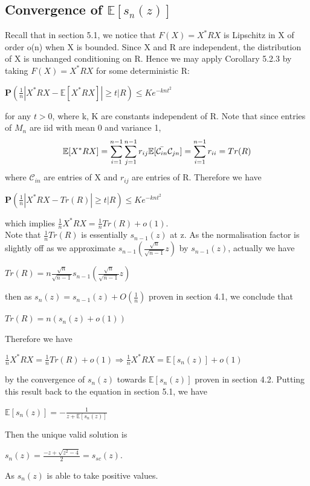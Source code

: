 \documentclass{article}
\begin{document}
\subsection{Convergence of $\mathbb{E}[s_n(z)]$}
Recall that in section 5.1, we notice that $F(X) = X^*RX$ is Lipschitz in X of order o(n) when X is bounded. Since X and R are independent, the distribution of X is unchanged conditioning on R. Hence we may apply Corollary 5.2.3 by taking $F(X) = X^*RX$ for some deterministic R:
\begin{center}
    $\mathbf{P}(\frac{1}{n}|X^*RX - \mathbb{E}[X^*RX]| \geq t |R) \leq Ke^{-knt^2}$
\end{center}
for any $t > 0$, where k, K are constants independent of R.
Note that since entries of $M_n$ are iid with mean 0 and variance 1, 
\begin{align*}
    \mathbb{E}[X^*RX]
    = \sum\limits_{i=1}^{n-1}\sum\limits_{j=1}^{n-1}r_{ij}\mathbb{E}[\Bar{\mathcal{C}_{in}}\mathcal{C}_{jn}]
    = \sum\limits_{i=1}^{n-1}r_{ii}
    = Tr(R)
\end{align*}
where $\mathcal{C}_{in}$ are entries of X and $r_{ij}$ are entries of R. Therefore we have
\begin{center}
    $\mathbf{P}(\frac{1}{n}|X^*RX - Tr(R)| \geq t |R) \leq Ke^{-knt^2}$
\end{center}
which implies $\frac{1}{n}X^*RX = \frac{1}{n}Tr(R) + o(1)$.\\
Note that $\frac{1}{n}Tr(R)$ is essentially $s_{n-1}(z)$ at z. As the normalisation factor is slightly off as we approximate $s_{n-1}(\frac{\sqrt{n}}{\sqrt{n-1}}z)$ by $s_{n-1}(z)$, actually we have
\begin{center}
    $Tr(R) = n\frac{\sqrt{n}}{\sqrt{n-1}}s_{n-1}\left(\frac{\sqrt{n}}{\sqrt{n-1}}z \right)$
\end{center}
then as $s_n(z) = s_{n-1}(z) + O(\frac{1}{n})$ proven in section 4.1, we conclude that
\begin{center}
    $Tr(R) = n(s_n(z) + o(1))$
\end{center}
Therefore we have
\begin{center}
    $\frac{1}{n}X^*RX = \frac{1}{n}Tr(R) + o(1) \Rightarrow \frac{1}{n}X^*RX = \mathbb{E}[s_n(z)] + o(1)$
\end{center}
by the convergence of $s_n(z)$ towards $\mathbb{E}[s_n(z)]$ proven in section 4.2.
Putting this result back to the equation in section 5.1, we have
\begin{center}
    $\mathbb{E}[s_n(z)] = -\frac{1}{z+\mathbb{E}[s_n(z)]}$
\end{center}
Then the unique valid solution is
\begin{center}
    $s_n(z) = \frac{-z+\sqrt{z^2-4}}{2} = s_{sc}(z).$
\end{center}
As $s_n(z)$ is able to take positive values.
\end{document}
